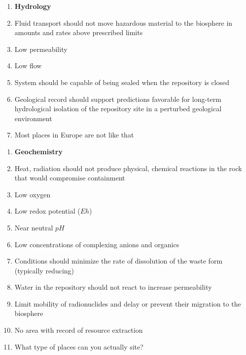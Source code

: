 \documentclass[aspectratio=1610,pdftex,dvipsnames,compress,xcolor={dvipsnames}]{beamer}
\begin{document}
\begin{frame}[t]{}
    \begin{enumerate}[series=outerlist,topsep=0pt,itemsep=1pt,leftmargin=*,label=(\arabic*)]
        \item[]\textbf{Hydrology}
        \item[]Fluid transport should not move hazardous material to the biosphere in amounts and rates above prescribed limits
        \item[]Low permeability
        \item[]Low flow
        \item[]System should be capable of being sealed when the repository is closed
        \item[]Geological record should support predictions favorable for long-term hydrological isolation of the repository site in a perturbed geological environment
        \item[]Most places in Europe are not like that
    \end{enumerate}
\end{frame}


\begin{frame}[t]{}
    \begin{enumerate}[series=outerlist,topsep=0pt,itemsep=1pt,leftmargin=*,label=(\arabic*)]
        \item[]\textbf{Geochemistry}
        \item[]Heat, radiation should not produce physical, chemical reactions in the rock that would compromise containment
        \item[]Low oxygen
        \item[]Low redox potential ($Eh$)
        \item[]Near neutral $pH$
        \item[]Low concentrations of complexing anions and organics
        \item[]Conditions should minimize the rate of dissolution of the waste form (typically reducing)
        \item[]Water in the repository should not react to increase permeability
        \item[]Limit mobility of radionuclides and delay or prevent their migration to the biosphere
        \item[]No area with record of resource extraction
        \item[]What type of places can you actually site?
    \end{enumerate}
\end{frame}
\end{document}
